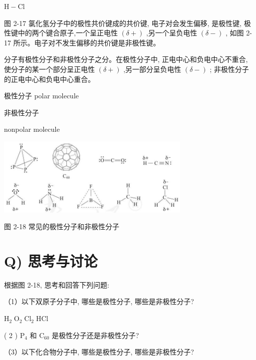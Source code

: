 \documentclass[10pt]{article}
\begin{document}
\begin{mdframed}

\(\mathrm{H} - \mathrm{{Cl}}\)

图 2-17 氯化氢分子中的极性共价键成的共价键, 电子对会发生偏移, 是极性键, 极性键中的两个键合原子,一个呈正电性 \(\left( {\delta + }\right)\) ,另一个呈负电性 \(\left( {\delta - }\right)\) , 如图 2-17 所示。电子对不发生偏移的共价键是非极性键。

\end{mdframed}

分子有极性分子和非极性分子之分。在极性分子中, 正电中心和负电中心不重合, 使分子的某一个部分呈正电性 \(\left( {\delta + }\right)\) ,另一部分呈负电性 \(\left( {\delta - }\right)\) ; 非极性分子的正电中心和负电中心重合。

\begin{mdframed}

极性分子 polar molecule

非极性分子

nonpolar molecule

\end{mdframed}

\begin{center}
\includegraphics[max width=0.7\textwidth]{images/0190e026-5a11-7df7-bd27-54d09026ba7a_55_319366.jpg}
\end{center}

图 2-18 常见的极性分子和非极性分子

\section*{Q) 思考与讨论}

根据图 2-18, 思考和回答下列问题:

（1）以下双原子分子中, 哪些是极性分子, 哪些是非极性分子?

\({\mathrm{H}}_{2}\;{\mathrm{O}}_{2}\;{\mathrm{{Cl}}}_{2}\;\mathrm{{HCl}}\)

( 2 ) \({\mathrm{P}}_{4}\) 和 \({\mathrm{C}}_{60}\) 是极性分子还是非极性分子?

（3）以下化合物分子中, 哪些是极性分子, 哪些是非极性分子?
\end{document}
